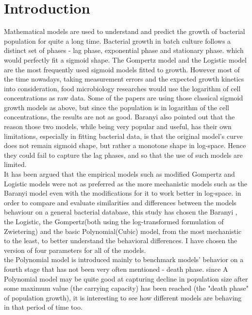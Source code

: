 \documentclass[11pt]{article}
\begin{document}
\section{Introduction}
Mathematical models are used to understand and predict the growth of bacterial population for quite a long time. Bacterial growth in batch culture follows a distinct set of phases - lag phase, exponential phase and stationary phase. which would perfectly fit a sigmoid shape. The Gompertz model\parencite{gompertz1825xxiv} and the Logistic model \parencite{verhulst1838notice} are the most frequently used sigmoid models fitted to growth\parencite{tjorve2017use}. However most of the time nowadays, taking measurement errors and the expected growth kinetics into consideration, food microbiology researches would use the logarithm of cell concentrations as raw data. Some of the papers are using those classical sigmoid growth models as above, but since the population is in logarithm of the cell concentrations, the results are not as good\parencite{baranyi2011modelling}.
Baranyi also pointed out that the reason those two models, while being very popular and useful, has their own limitations, especially in fitting bacterial data, is that the original model's curve does not remain sigmoid shape, but rather a monotone shape in log-space. Hence they could fail to capture the lag phases, and so that the use of such models are limited\parencite{baranyi2011modelling}.\\
It has been argued that the empirical models such as modified Gompertz and Logistic models were not as preferred as the more mechanistic models such as the Baranyi model even with the modifications for it to work better in log-space\parencite{juneja2009mathematical}. in order to compare and evaluate similarities and differences between the models behaviour on a general bacterial database, this study has chosen the Baranyi \parencite{baranyi1993non}, the Logistic, the Gompertz(both using the log-transformed formulation of Zwietering)\parencite{zwietering1990modeling} and the basic Polynomial(Cubic) model, from the most mechanistic to the least, to better understand the behavioral differences. I have chosen the version of four parameters for all of the models.\\
the Polynomial model is introduced mainly to benchmark models' behavior on a fourth stage that has not been very often mentioned - death phase. since A Polynomial model may be quite good at capturing decline in population size after some maximum value (the carrying capacity) has been reached (the "death phase" of population growth)\parencite{buchanan1918life}, it is interesting to see how different models are behaving in that period of time too.\\
\end{document}
